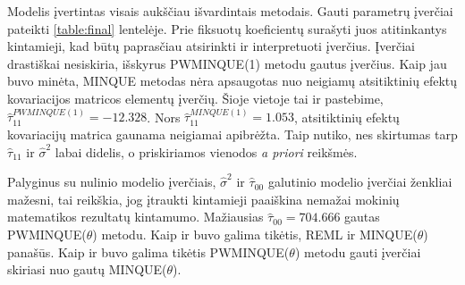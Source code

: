 \documentclass[11pt,a4paper]{article}
\begin{document}
\indent Modelis įvertintas visais aukščiau išvardintais metodais. Gauti parametrų įverčiai pateikti \ref{table:final} lentelėje. Prie fiksuotų koeficientų surašyti juos atitinkantys kintamieji, kad būtų paprasčiau atsirinkti ir interpretuoti įverčius. Įverčiai drastiškai nesiskiria, išskyrus  PWMINQUE(1) metodu gautus įverčius. Kaip jau buvo minėta, MINQUE metodas nėra apsaugotas nuo neigiamų atsitiktinių efektų kovariacijos matricos elementų įverčių. Šioje vietoje tai ir pastebime,  $\hat{\tau}_{11}^{PWMINQUE(1)}= -12.328$. Nors $\hat{\tau}_{11}^{MINQUE(1)}= 1.053$, atsitiktinių efektų kovariacijų matrica gaunama neigiamai apibrėžta. Taip nutiko, nes skirtumas tarp $\hat{\tau}_{11}$ ir $\hat{\sigma}^2$ labai didelis, o priskiriamos vienodos \textit{a priori} reikšmės.

\indent Palyginus su nulinio modelio įverčiais, $\hat{\sigma}^2$ ir $\hat{\tau}_{00}$ galutinio modelio įverčiai ženkliai mažesni, tai reikškia, jog įtraukti kintamieji paaiškina nemažai mokinių matematikos rezultatų kintamumo. Mažiausias $\hat{\tau}_{00}=704.666$ gautas PWMINQUE($\theta$) metodu. Kaip ir buvo galima tikėtis, REML ir MINQUE($\theta$) panašūs. Kaip ir buvo galima tikėtis PWMINQUE($\theta$) metodu gauti įverčiai skiriasi nuo gautų MINQUE($\theta$).
\end{document}
